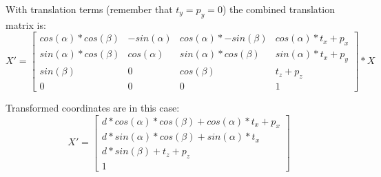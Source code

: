 \documentclass{article}
\begin{document}
With translation terms (remember that $t_y = p_y = 0$) the combined translation matrix is:
\begin{equation}
X' = 
\begin{bmatrix}
cos(\alpha)*cos(\beta) & -sin(\alpha) & cos(\alpha)*-sin(\beta) & cos(\alpha)*t_x + p_x \\
sin(\alpha)*cos(\beta) & cos(\alpha) & sin(\alpha)*cos(\beta) &
sin(\alpha)*t_x + p_y \\
sin(\beta)	&	0	& cos(\beta) & t_z + p_z \\
0 & 0 & 0 & 1
\end{bmatrix}
* X
\end{equation}

Transformed coordinates are in this case:
\begin{equation}
X' = 
\begin{bmatrix}
d * cos(\alpha) * cos(\beta) + cos(\alpha)*t_x + p_x \\
d * sin(\alpha) * cos(\beta) + sin(\alpha)*t_x \\
d * sin(\beta) + t_z + p_z \\
1
\end{bmatrix}
\end{equation}
\end{document}

